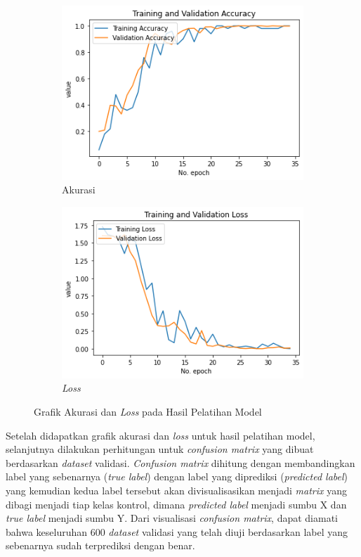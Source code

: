 \begin{figure}[ht]
  \centering
  \begin{subfigure}[b]{0.72\textwidth}
      \includegraphics[width=\textwidth]{gambar/bab4/model5 (30cm)/train.png}
      \caption{Akurasi}
  \end{subfigure}

  \begin{subfigure}[b]{0.72\textwidth}
      \includegraphics[width=\textwidth]{gambar/bab4/model5 (30cm)/loss.png}
      \caption{\emph{Loss}}
  \end{subfigure}
  \caption{Grafik Akurasi dan \emph{Loss} pada Hasil Pelatihan Model}
  \label{fig:acc_loss}
\end{figure}

Setelah didapatkan grafik akurasi dan \emph{loss} untuk hasil pelatihan model, selanjutnya dilakukan perhitungan untuk \emph{confusion matrix} yang dibuat berdasarkan \emph{dataset} validasi. \emph{Confusion matrix} dihitung dengan membandingkan label yang sebenarnya (\emph{true label}) dengan label yang diprediksi (\emph{predicted label}) yang kemudian kedua label tersebut akan divisualisasikan menjadi \emph{matrix} yang dibagi menjadi tiap kelas kontrol, dimana \emph{predicted label} menjadi sumbu X dan \emph{true label} menjadi sumbu Y. Dari visualisasi \emph{confusion matrix}, dapat diamati bahwa keseluruhan 600 \emph{dataset} validasi yang telah diuji berdasarkan label yang sebenarnya sudah terprediksi dengan benar.

